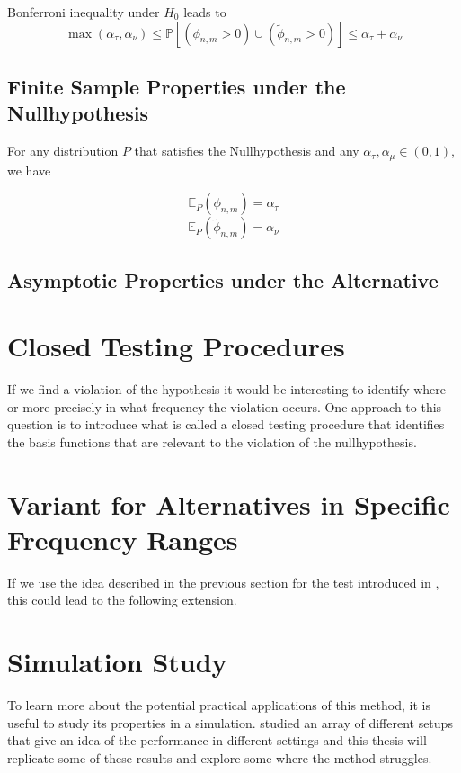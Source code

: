 \documentclass[12pt, a4paper]{article}
\theoremstyle{MAstyle} \newtheorem{assumption}{Assumption}[section]
\theoremstyle{MAstyle} \newtheorem{definition}{Definition}[section]
\theoremstyle{MAstyle} \newtheorem{theorem}{Theorem}[section]
\begin{document}
			Bonferroni inequality under $H_0$ leads to
			\begin{equation}
				\max(\alpha_{\tau}, \alpha_{\nu}) \leq \mathbb{P}\left[(\phi_{n,m} > 0) \cup (\tilde{\phi}_{n,m} > 0)\right] \leq \alpha_{\tau} + \alpha_{\nu}
			\end{equation}
		
		\subsection{Finite Sample Properties under the Nullhypothesis}
		For any distribution $P$ that satisfies the Nullhypothesis and any $\alpha_{\tau}, \alpha_{\mu} \in (0,1)$, we have 
		\begin{multicols}{2}
			\noindent
			\begin{equation*}
				\mathbb{E}_P\left(\phi_{n,m}\right) = \alpha_{\tau}
			\end{equation*}			
			\begin{equation}
				\mathbb{E}_P\left(\tilde{\phi}_{n,m}\right) = \alpha_{\nu}
			\end{equation}
		\end{multicols}
		
		\subsection{Asymptotic Properties under the Alternative}
		
	\section{Closed Testing Procedures}\label{closed_testing}
		If we find a violation of the hypothesis it would be interesting to identify where or more precisely in what frequency the violation occurs. One approach to this question is to introduce what is called a closed testing procedure that identifies the basis functions that are relevant to the violation of the nullhypothesis. 			
		
	\section{Variant for Alternatives in Specific Frequency Ranges}\label{frequency_identification}
		If we use the idea described in the previous section for the test introduced in \cite{bugni_permutation_2021}, this could lead to the following extension.
		
	\section{Simulation Study}\label{Simulation_Study}
		To learn more about the potential practical applications of this method, it is useful to study its properties in a simulation. \cite{bugni_permutation_2021} studied an array of different setups that give an idea of the performance in different settings and this thesis will replicate some of these results and explore some where the method struggles.
	
\end{document}
